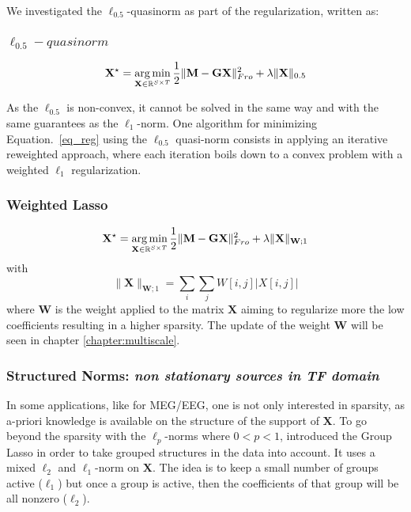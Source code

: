 We investigated the $\ell_{0.5}$-quasinorm as part of the regularization, written as:
\adjustwidth{1em}{0pt}
\subsubsection*{$\ell_{0.5}-quasinorm$}
\begin{equation} \label{eq_quasinorm}
	\mathbf{X}^\star = \mathop{\mathrm{arg}\,\mathrm{min}}_{\mathbf{X}\in\mathbb{R}^{S\times T}}\frac{1}{2}\|\mathbf{M}-\mathbf{GX}\|_{Fro}^2 + \lambda\|\mathbf{X}\|_{0.5}
\end{equation}
\endadjustwidth

As the $\ell_{0.5}$ is non-convex, it cannot be solved in the same way and with the same guarantees as the $\ell_1$-norm. One algorithm for minimizing Equation.~\eqref{eq_reg} using the $\ell_{0.5}$ quasi-norm consists in applying an iterative reweighted approach, where each iteration boils down to a convex problem with a weighted $\ell_1$ regularization.
\adjustwidth{1em}{0pt}

\subsubsection*{Weighted Lasso}
\begin{equation} \label{eq_wlasso}
	\mathbf{X}^\star = \mathop{\mathrm{arg}\,\mathrm{min}}_{\mathbf{X}\in\mathbb{R}^{S\times T}}\frac{1}{2}\|\mathbf{M}-\mathbf{GX}\|_{Fro}^2 + \lambda\|\mathbf{X}\|_{\mathbf{W};1}
\end{equation}
with
\begin{equation*}
	\|\mathbf{X}\|_{\mathbf{W};1}=\sum_i\sum_j W[i,j]|X[i,j]|
\end{equation*}
where $\mathbf{W}$ is the weight applied to the matrix $\mathbf{X}$ aiming to regularize more the low coefficients resulting in a higher sparsity. The update of the weight $\mathbf{W}$ will be seen in chapter \ref{chapter:multiscale}.
\endadjustwidth

\subsubsection*{Structured Norms: \textit{non stationary sources in TF domain}}
In some applications, like for MEG/EEG, one is not only interested in sparsity, as a-priori knowledge is available on the structure of the support of $\mathbf{X}$. To go beyond the sparsity with the $\ell_p$-norms where $0<p<1$, \cite{yuan2006model} introduced the Group Lasso in order to take grouped structures  in the data into account. It uses a mixed $\ell_2$ and $\ell_1$-norm on $\mathbf{X}$. The idea is to keep a small number of groups active ($\ell_1$) but once a group is active, then the coefficients of that group will be all nonzero ($\ell_2$).
\adjustwidth{1em}{0pt}
\vspace{-10pt}
